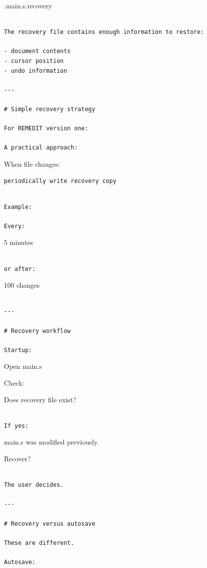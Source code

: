 \documentclass[
  oneside,
  openany]{book}
\begin{document}
.main.s.recovery

\begin{verbatim}

The recovery file contains enough information to restore:

- document contents
- cursor position
- undo information

---

# Simple recovery strategy

For REMEDIT version one:

A practical approach:
\end{verbatim}

When file changes:

\begin{verbatim}
periodically write recovery copy
\end{verbatim}

\begin{verbatim}

Example:

Every:
\end{verbatim}

5 minutes

\begin{verbatim}

or after:
\end{verbatim}

100 changes

\begin{verbatim}

---

# Recovery workflow

Startup:
\end{verbatim}

Open main.s

Check:

Does recovery file exist?

\begin{verbatim}

If yes:
\end{verbatim}

main.s was modified previously.

Recover?

\begin{verbatim}

The user decides.

---

# Recovery versus autosave

These are different.

Autosave:
\end{verbatim}
\end{document}
